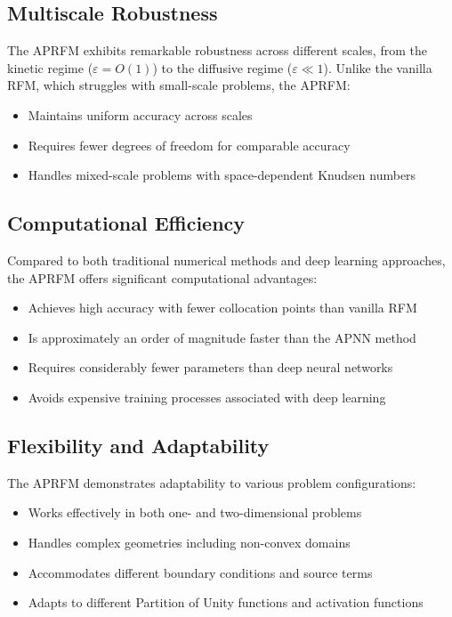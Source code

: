 \documentclass[11pt]{article}
\begin{document}
\subsection{Multiscale Robustness}

The APRFM exhibits remarkable robustness across different scales, from the kinetic regime ($\varepsilon = O(1)$) to the diffusive regime ($\varepsilon \ll 1$). Unlike the vanilla RFM, which struggles with small-scale problems, the APRFM:
\begin{itemize}
    \item Maintains uniform accuracy across scales
    \item Requires fewer degrees of freedom for comparable accuracy
    \item Handles mixed-scale problems with space-dependent Knudsen numbers
\end{itemize}

\subsection{Computational Efficiency}

Compared to both traditional numerical methods and deep learning approaches, the APRFM offers significant computational advantages:
\begin{itemize}
    \item Achieves high accuracy with fewer collocation points than vanilla RFM
    \item Is approximately an order of magnitude faster than the APNN method
    \item Requires considerably fewer parameters than deep neural networks
    \item Avoids expensive training processes associated with deep learning
\end{itemize}

\subsection{Flexibility and Adaptability}

The APRFM demonstrates adaptability to various problem configurations:
\begin{itemize}
    \item Works effectively in both one- and two-dimensional problems
    \item Handles complex geometries including non-convex domains
    \item Accommodates different boundary conditions and source terms
    \item Adapts to different Partition of Unity functions and activation functions
\end{itemize}
\end{document}
